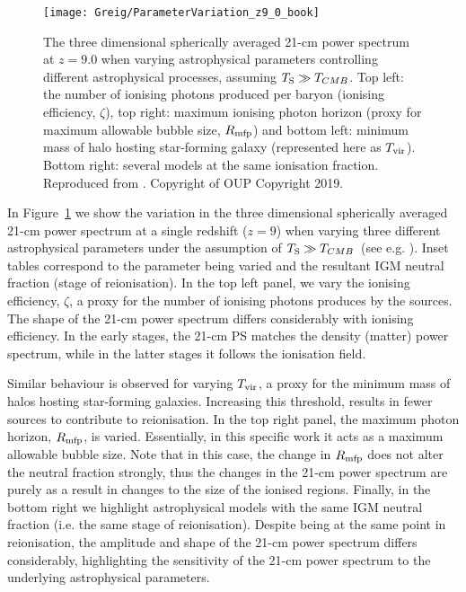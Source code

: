 \begin{figure}[]
\begin{center}
\texttt{[image: Greig/ParameterVariation\_z9\_0\_book]}
\end{center}
\caption{The three dimensional spherically averaged 21-cm power spectrum at $z=9.0$ when varying astrophysical parameters controlling different astrophysical processes, assuming $T_{\rm S} \gg T_{CMB}$. Top left: the number of ionising photons produced per baryon (ionising efficiency, $\zeta$), top right: maximum ionising photon horizon (proxy for maximum allowable bubble size, $R_{\rm mfp}$) and bottom left: minimum mass of halo hosting star-forming galaxy (represented here as $T_{\rm vir}$). Bottom right: several models at the same ionisation fraction. Reproduced from \cite{Greig:2015}. Copyright of OUP Copyright 2019.}
\label{fig:PSvariation}
\end{figure}

In Figure~\ref{fig:PSvariation} we show the variation in the three dimensional spherically averaged 21-cm power spectrum at a single redshift ($z=9$) when varying three different astrophysical parameters under the assumption of $T_{\rm S} \gg T_{CMB}$~(see e.g. \cite{Greig:2015}). Inset tables correspond to the parameter being varied and the resultant IGM neutral fraction (stage of reionisation). In the top left panel, we vary the ionising efficiency, $\zeta$, a proxy for the number of ionising photons produces by the sources. The shape of the 21-cm power spectrum differs considerably with ionising efficiency. In the early stages, the 21-cm PS matches the density (matter) power spectrum, while in the latter stages it follows the ionisation field. 

Similar behaviour is observed for varying $T_{\rm vir}$, a proxy for the minimum mass of halos hosting star-forming galaxies. Increasing this threshold, results in fewer sources to contribute to reionisation. In the top right panel, the maximum photon horizon, $R_{\rm mfp}$, is varied. Essentially, in this specific work it acts as a maximum allowable bubble size. Note that in this case, the change in $R_{\rm mfp}$ does not alter the neutral fraction strongly, thus the changes in the 21-cm power spectrum are purely as a result in changes to the size of the ionised regions. Finally, in the bottom right we highlight astrophysical models with the same IGM neutral fraction (i.e. the same stage of reionisation). Despite being at the same point in reionisation, the amplitude and shape of the 21-cm power spectrum differs considerably, highlighting the sensitivity of the 21-cm power spectrum to the underlying astrophysical parameters. 

